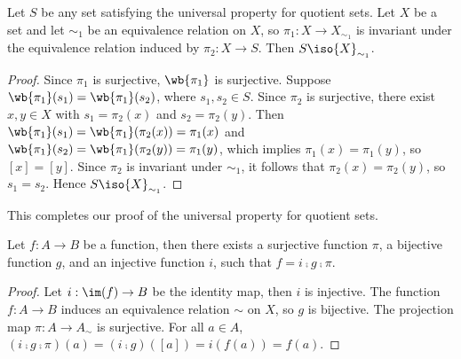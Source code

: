 \documentclass[10pt]{article}
\begin{document}
\begin{proposition}
    Let $S$ be any set satisfying the universal property for quotient sets. Let $X$ be a set and let ${\sim}_{1}$ be an equivalence relation on $X$, so ${\pi}_{1}:X\to{X}_{{\sim}_{1}}$ is invariant under the equivalence relation induced by ${\pi}_{2}:X\to S$. Then $S\iso{X}_{{\sim}_{1}}$.
\end{proposition}
\begin{center}
\end{center}
\begin{proof}
    Since ${\pi}_{1}$ is surjective, $\wb{{\pi}_{1}}$ is surjective. Suppose $\wb{{\pi}_{1}}({s}_{1})=\wb{{\pi}_{1}}({s}_{2})$, where ${s}_{1}, {s}_{2}\in S$. Since $\pi_2$ is surjective, there exist $x,y\in X$ with ${s}_{1}={\pi}_{2}(x)$ and ${s}_{2}={\pi}_{2}(y)$. Then $\wb{{\pi}_{1}}({s}_{1})=\wb{{\pi}_{1}}({\pi}_{2}(x))={\pi}_{1}(x)$ and $\wb{{\pi}_{1}}({s}_{2})=\wb{{\pi}_{1}}({\pi}_{2}(y))={\pi}_{1}(y)$, which implies ${\pi}_{1}(x)={\pi}_{1}(y)$, so $[x]=[y]$. Since ${\pi}_{2}$ is invariant under ${\sim}_{1}$, it follows that ${\pi}_{2}(x)={\pi}_{2}(y)$, so ${s}_{1}={s}_{2}$. Hence $S\iso{X}_{{\sim}_{1}}$.        
\end{proof}
\par
This completes our proof of the universal property for quotient sets.
\begin{theorem}
    Let $f:A\to B$ be a function, then there exists a surjective function $\pi$, a bijective function $g$, and an injective function $i$, such that $f=i\comp g\comp\pi$.
\end{theorem}
\begin{center}
\end{center}
\begin{proof}
    Let $i:\im(f)\to B$ be the identity map, then $i$ is injective. The function $f:A\to B$ induces an equivalence relation $\sim$ on $X$, so $g$ is bijective. The projection map $\pi:A\to{A}_{\sim}$ is surjective. For all $a\in A$, $(i\comp g\comp\pi)(a)=(i\comp g)([a])=i(f(a))=f(a)$. 
\end{proof}
\end{document}
